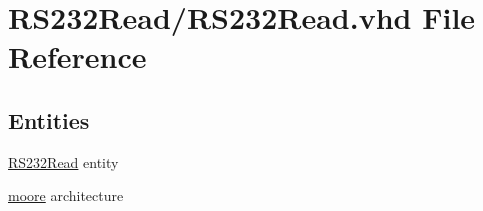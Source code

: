\hypertarget{_r_s232_read_8vhd}{}\section{R\+S232\+Read/\+R\+S232\+Read.vhd File Reference}
\label{_r_s232_read_8vhd}
\subsection*{Entities}
\begin{DoxyCompactItemize}
\item 
\hyperlink{class_r_s232_read}{R\+S232\+Read} entity
\item 
\hyperlink{class_r_s232_read_1_1moore}{moore} architecture
\end{DoxyCompactItemize}
